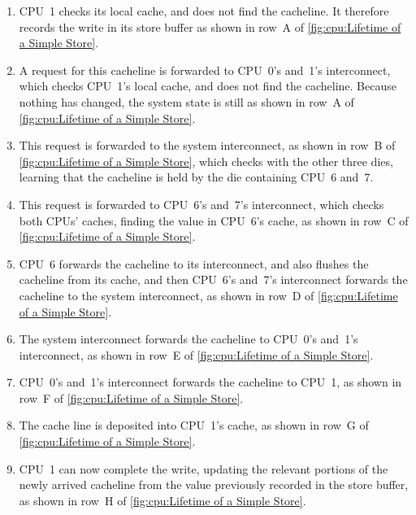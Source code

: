 \begin{enumerate}
\item	CPU~1 checks its local cache, and does not find the cacheline.
	It therefore records the write in its store buffer as shown
	in row~A of
	\cref{fig:cpu:Lifetime of a Simple Store}.
\item	A request for this cacheline is forwarded to CPU~0's and~1's
	interconnect, which checks CPU~1's local cache, and does not
	find the cacheline.
	Because nothing has changed, the system state is still as shown
	in row~A of
	\cref{fig:cpu:Lifetime of a Simple Store}.
\item	This request is forwarded to the system interconnect, as shown
	in row~B of
	\cref{fig:cpu:Lifetime of a Simple Store},
	which checks with the other three dies, learning that the
	cacheline is held by the die containing CPU~6 and~7.
\item	This request is forwarded to CPU~6's and~7's interconnect, which
	checks both CPUs' caches, finding the value in CPU~6's cache,
	as shown in row~C of
	\cref{fig:cpu:Lifetime of a Simple Store}.
\item	CPU~6 forwards the cacheline to its interconnect, and also
	flushes the cacheline from its cache, and then
	CPU~6's and~7's interconnect forwards the cacheline to the
	system interconnect, as shown in row~D of
	\cref{fig:cpu:Lifetime of a Simple Store}.
\item	The system interconnect forwards the cacheline to CPU~0's and~1's
	interconnect, as shown in row~E of
	\cref{fig:cpu:Lifetime of a Simple Store}.
\item	CPU~0's and~1's interconnect forwards the cacheline to CPU~1,
	as shown in row~F of
	\cref{fig:cpu:Lifetime of a Simple Store}.
\item	The cache line is deposited into CPU~1's cache, as shown in
	row~G of
	\cref{fig:cpu:Lifetime of a Simple Store}.
\item	CPU~1 can now complete the write, updating the relevant portions
	of the newly arrived cacheline from the value previously
	recorded in the store buffer, as shown in row~H of
	\cref{fig:cpu:Lifetime of a Simple Store}.
\end{enumerate}

